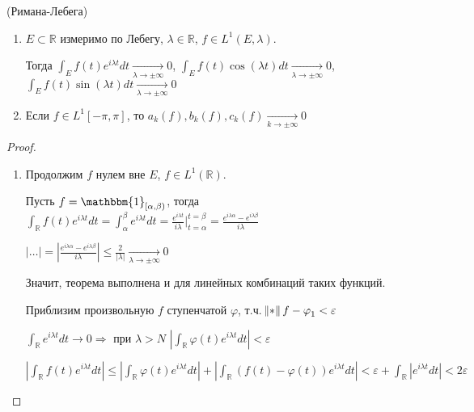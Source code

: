 \begin{lemma}(Римана-Лебега)
    \begin{enumerate}
        \item $E\subset \mathbb{R}$ измеримо по Лебегу, $\lambda \in \mathbb{R}$, $f \in L^1(E, \lambda)$.

              Тогда $\int_E f(t)e^{i\lambda t}dt \underset{\lambda\rightarrow\pm\infty}{\rightarrow} 0$,
              $\int_E f(t)\cos(\lambda t)dt \underset{\lambda\rightarrow\pm\infty}{\rightarrow} 0$,
              $\int_E f(t)\sin(\lambda t)dt \underset{\lambda\rightarrow\pm\infty}{\rightarrow} 0$
        \item Если $f\in L^1[-\pi, \pi]$, то $a_k(f), b_k(f), c_k(f)\underset{k\rightarrow\pm\infty}{\rightarrow} 0$
    \end{enumerate}
\end{lemma}
\begin{proof}
    \begin{enumerate}
        \item Продолжим $f$ нулем вне $E$, $f\in L^1(\mathbb{R})$.

              Пусть $f = \mathbbm{1}_{[\alpha, \beta)}$, тогда $\int_\mathbb{R} f(t)e^{i\lambda t}dt = \int_\alpha^\beta e^{i\lambda t}dt
                  = \frac{e^{i\lambda t}}{i\lambda}\Big|_{t = \alpha}^{t = \beta} = \frac{e^{i\lambda\alpha} -
                      e^{i\lambda \beta}}{i\lambda}$

              $|\ldots| = |\frac{e^{i\lambda\alpha} -
                      e^{i\lambda \beta}}{i\lambda}| \le \frac{2}{|\lambda|}  \underset{\lambda\rightarrow\pm\infty}{\rightarrow} 0$

              Значит, теорема выполнена и для линейных комбинаций таких функций.

              Приблизим произвольную $f$ ступенчатой $\varphi$, т.ч. $\norm{f - \varphi}_1 < \varepsilon$

              $\int_{\mathbb{R}} e^{i\lambda t}dt \rightarrow 0 \Rightarrow $ при $\lambda > N$
              $|\int_\mathbb{R}\varphi(t)e^{i\lambda t}dt| < \varepsilon$

              $|\int_\mathbb{R}f(t)e^{i\lambda t}dt| \le  |\int_\mathbb{R}\varphi(t)e^{i\lambda t}dt| + |\int_\mathbb{R}(f(t) - \varphi(t))e^{i\lambda t}dt| < \varepsilon + \int_\mathbb{R}|e^{i\lambda t}dt| < 2\varepsilon$
    \end{enumerate}
\end{proof}

\newpage

